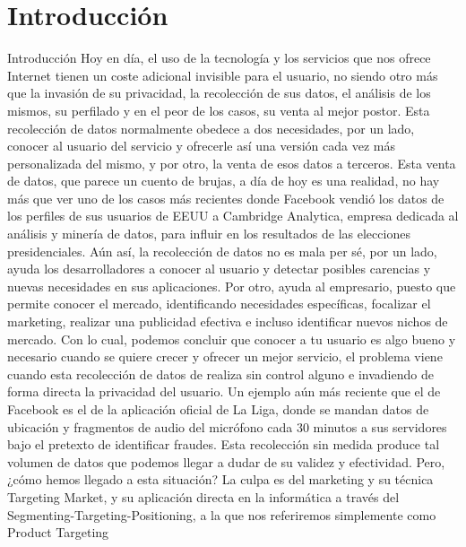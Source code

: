 \documentclass[12pt,a4paper,oneside]{book} %
\begin{document}
\chapter{Introducción}
Introducción 
Hoy en día, el uso de la tecnología y los servicios que nos ofrece Internet tienen un coste adicional invisible para el usuario, no siendo otro más que la invasión de su privacidad, la recolección de sus datos, el análisis de los mismos, su perfilado y en el peor de los casos, su venta al mejor postor.
\newline \newline
Esta recolección de datos normalmente  obedece a dos necesidades, por un lado, conocer al usuario del servicio y ofrecerle así una versión cada vez más personalizada del mismo, y por otro, la venta de esos datos a terceros. 
\newline \newline
Esta venta de datos, que parece un cuento de brujas, a día de hoy es una realidad, no hay más que ver uno de los casos más recientes donde Facebook vendió los datos de los perfiles de sus usuarios de EEUU a Cambridge Analytica, empresa dedicada al análisis y minería de datos, para influir en los resultados de las elecciones presidenciales. 
\newline \newline
Aún así, la recolección de datos no es mala per sé, por un lado, ayuda los desarrolladores a conocer al usuario y detectar posibles carencias y nuevas necesidades en sus aplicaciones. Por otro, ayuda al empresario, puesto que permite conocer el mercado, identificando necesidades específicas, focalizar el marketing, realizar una publicidad efectiva e incluso identificar nuevos nichos de mercado. 
\newline \newline
Con lo cual, podemos concluir que conocer a tu usuario es algo bueno y necesario cuando se quiere crecer y ofrecer un mejor servicio, el problema viene cuando esta recolección de datos de realiza sin control alguno e invadiendo de forma directa la privacidad del usuario. Un ejemplo aún más reciente que el de Facebook es el de la aplicación oficial de La Liga, donde se mandan datos de ubicación y fragmentos de audio del micrófono cada 30 minutos a sus servidores bajo el pretexto de identificar fraudes. Esta recolección sin medida produce tal volumen de datos que podemos llegar a dudar de su validez y efectividad. 
\newline \newline
Pero, ¿cómo hemos llegado a esta situación? La culpa es del marketing y su técnica Targeting Market, y su aplicación directa en la informática a través del Segmenting-Targeting-Positioning, a la que nos referiremos simplemente como Product Targeting
\end{document}
